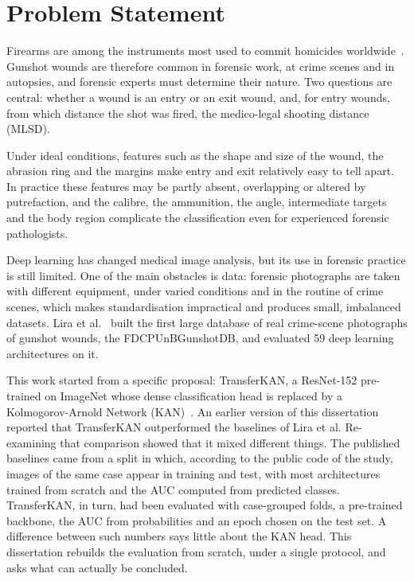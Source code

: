 \label{chap:introduction}

\section{Problem Statement}
\label{sec_problem}

Firearms are among the instruments most used to commit homicides worldwide~\cite{unodc2023homicide}. Gunshot wounds are therefore common in forensic work, at crime scenes and in autopsies, and forensic experts must determine their nature. Two questions are central: whether a wound is an entry or an exit wound, and, for entry wounds, from which distance the shot was fired, the medico-legal shooting distance (MLSD).

Under ideal conditions, features such as the shape and size of the wound, the abrasion ring and the margins make entry and exit relatively easy to tell apart. In practice these features may be partly absent, overlapping or altered by putrefaction, and the calibre, the ammunition, the angle, intermediate targets and the body region complicate the classification even for experienced forensic pathologists.

Deep learning has changed medical image analysis, but its use in forensic practice is still limited. One of the main obstacles is data: forensic photographs are taken with different equipment, under varied conditions and in the routine of crime scenes, which makes standardisation impractical and produces small, imbalanced datasets. Lira et al.~\cite{Lira2025deep} built the first large database of real crime-scene photographs of gunshot wounds, the FDCPUnBGunshotDB, and evaluated 59 deep learning architectures on it.

This work started from a specific proposal: TransferKAN, a ResNet-152 pre-trained on ImageNet whose dense classification head is replaced by a Kolmogorov-Arnold Network (KAN)~\cite{liu2024kan}. An earlier version of this dissertation reported that TransferKAN outperformed the baselines of Lira et al. Re-examining that comparison showed that it mixed different things. The published baselines came from a split in which, according to the public code of the study, images of the same case appear in training and test, with most architectures trained from scratch and the AUC computed from predicted classes. TransferKAN, in turn, had been evaluated with case-grouped folds, a pre-trained backbone, the AUC from probabilities and an epoch chosen on the test set. A difference between such numbers says little about the KAN head. This dissertation rebuilds the evaluation from scratch, under a single protocol, and asks what can actually be concluded.

